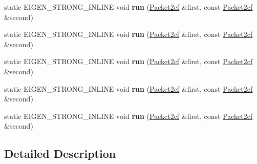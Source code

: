 \begin{DoxyCompactItemize}
static E\+I\+G\+E\+N\+\_\+\+S\+T\+R\+O\+N\+G\+\_\+\+I\+N\+L\+I\+NE void {\bfseries run} (\hyperlink{struct_eigen_1_1internal_1_1_packet2cf}{Packet2cf} \&first, const \hyperlink{struct_eigen_1_1internal_1_1_packet2cf}{Packet2cf} \&second)
\item 
\mbox{\label{struct_eigen_1_1internal_1_1palign__impl_3_01_offset_00_01_packet2cf_01_4_a646ffaa2ab1f139214316298785aec89}} 
static E\+I\+G\+E\+N\+\_\+\+S\+T\+R\+O\+N\+G\+\_\+\+I\+N\+L\+I\+NE void {\bfseries run} (\hyperlink{struct_eigen_1_1internal_1_1_packet2cf}{Packet2cf} \&first, const \hyperlink{struct_eigen_1_1internal_1_1_packet2cf}{Packet2cf} \&second)
\item 
\mbox{\label{struct_eigen_1_1internal_1_1palign__impl_3_01_offset_00_01_packet2cf_01_4_a646ffaa2ab1f139214316298785aec89}} 
static E\+I\+G\+E\+N\+\_\+\+S\+T\+R\+O\+N\+G\+\_\+\+I\+N\+L\+I\+NE void {\bfseries run} (\hyperlink{struct_eigen_1_1internal_1_1_packet2cf}{Packet2cf} \&first, const \hyperlink{struct_eigen_1_1internal_1_1_packet2cf}{Packet2cf} \&second)
\item 
\mbox{\label{struct_eigen_1_1internal_1_1palign__impl_3_01_offset_00_01_packet2cf_01_4_a646ffaa2ab1f139214316298785aec89}} 
static E\+I\+G\+E\+N\+\_\+\+S\+T\+R\+O\+N\+G\+\_\+\+I\+N\+L\+I\+NE void {\bfseries run} (\hyperlink{struct_eigen_1_1internal_1_1_packet2cf}{Packet2cf} \&first, const \hyperlink{struct_eigen_1_1internal_1_1_packet2cf}{Packet2cf} \&second)
\item 
\mbox{\label{struct_eigen_1_1internal_1_1palign__impl_3_01_offset_00_01_packet2cf_01_4_a646ffaa2ab1f139214316298785aec89}} 
static E\+I\+G\+E\+N\+\_\+\+S\+T\+R\+O\+N\+G\+\_\+\+I\+N\+L\+I\+NE void {\bfseries run} (\hyperlink{struct_eigen_1_1internal_1_1_packet2cf}{Packet2cf} \&first, const \hyperlink{struct_eigen_1_1internal_1_1_packet2cf}{Packet2cf} \&second)
\end{DoxyCompactItemize}


\subsection{Detailed Description}
